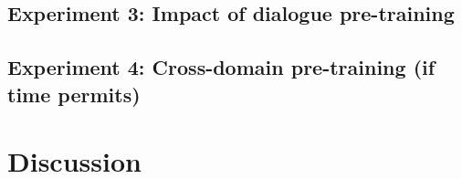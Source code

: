 \documentclass[11pt,a4paper]{article}
\begin{document}
\subsection{Experiment 3: Impact of dialogue pre-training} %

\subsection{Experiment 4: Cross-domain pre-training (if time permits)} %

\section{Discussion} %



\end{document}
